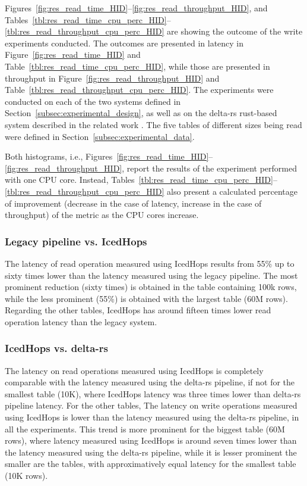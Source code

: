 Figures~\ref{fig:res_read_time_HID}--\ref{fig:res_read_throughput_HID}, and Tables~\ref{tbl:res_read_time_cpu_perc_HID}--\ref{tbl:res_read_throughput_cpu_perc_HID} are showing the outcome of the write experiments conducted. The outcomes are presented in latency in Figure~\ref{fig:res_read_time_HID} and Table~\ref{tbl:res_read_time_cpu_perc_HID}, while those are presented in throughput in Figure~\ref{fig:res_read_throughput_HID} and Table~\ref{tbl:res_read_throughput_cpu_perc_HID}. The experiments were conducted on each of the two systems defined in Section~\ref{subsec:experimental_design}, as well as on the delta-rs rust-based system described in the related work \cite{manfrediReducingReadWrite2024}. The five tables of different sizes being read were defined in Section~\ref{subsec:experimental_data}.

Both histograms, i.e., Figures~\ref{fig:res_read_time_HID}--\ref{fig:res_read_throughput_HID}, report the results of the experiment performed with one \gls{CPU} core. Instead, Tables~\ref{tbl:res_read_time_cpu_perc_HID}--\ref{tbl:res_read_throughput_cpu_perc_HID} also present a calculated percentage of improvement (decrease in the case of latency, increase in the case of throughput) of the metric as the \gls{CPU} cores increase.

\subsubsection*{Legacy pipeline vs. IcedHops}
The latency of read operation measured using IcedHops results from 55\% up to sixty times lower than the latency measured using the legacy pipeline. The most prominent reduction  (sixty times) is obtained in the table containing 100k rows, while the less prominent (55\%) is obtained with the largest table (60M rows). Regarding the other tables, IcedHops has around fifteen times lower read operation latency than the legacy system.

\subsubsection*{IcedHops vs. delta-rs}
The latency on read operations measured using IcedHops is completely comparable with the latency measured using the delta-rs pipeline, if not for the smallest table (10K), where IcedHops latency was three times lower than delta-rs pipeline latency. For the other tables,
The latency on write operations measured using IcedHops is lower than the latency measured using the delta-rs pipeline, in all the experiments. This trend is more prominent for the biggest table (60M rows), where latency measured using IcedHops is around seven times lower than the latency measured using the delta-rs pipeline, while it is lesser prominent the smaller are the tables, with approximatively equal latency for the smallest table (10K rows).

